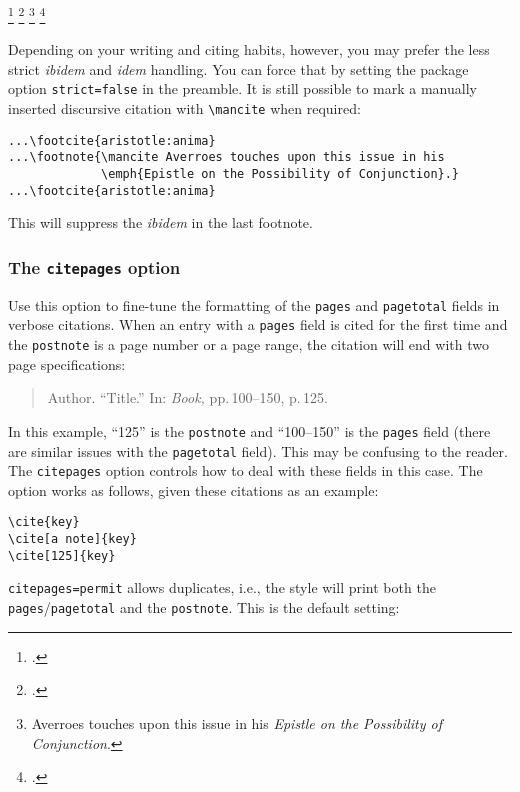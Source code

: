 \documentclass[a4paper]{article}
\newcommand*{\cmd}[1]{\texttt{\textbackslash #1}}
\newenvironment*{pseudofootnotes*}
  {\pseudofootnotes
   \def\footnote##1{\item##1\mancite}}
  {\endpseudofootnotes}
\begin{document}
\begin{pseudofootnotes*}
\footcite{aristotle:anima}
\footcite{aristotle:anima}
\footnote{Averroes touches upon this issue in his \emph{Epistle on
the Possibility of Conjunction}.}
\footcite{aristotle:anima}
\end{pseudofootnotes*}
%
Depending on your writing and citing habits, however, you may prefer
the less strict \emph{ibidem} and \emph{idem} handling. You can
force that by setting the package option \texttt{strict=false} in
the preamble. It is still possible to mark a manually inserted
discursive citation with \cmd{mancite} when required:

\begin{verbatim}
...\footcite{aristotle:anima}
...\footnote{\mancite Averroes touches upon this issue in his
             \emph{Epistle on the Possibility of Conjunction}.}
...\footcite{aristotle:anima}
\end{verbatim}
%
This will suppress the \emph{ibidem} in the last footnote.

\subsubsection*{The \texttt{citepages} option}

Use this option to fine-tune the formatting of the \texttt{pages}
and \texttt{pagetotal} fields in verbose citations. When an entry
with a \texttt{pages} field is cited for the first time and the
\texttt{postnote} is a page number or a page range, the citation
will end with two page specifications:

\begin{quote}
Author. \enquote{Title.} In: \emph{Book,} pp.\,100--150, p.\,125.
\end{quote}
%
In this example, \enquote{125} is the \texttt{postnote} and
\enquote{100--150} is the \texttt{pages} field (there are similar
issues with the \texttt{pagetotal} field). This may be confusing to
the reader. The \texttt{citepages} option controls how to deal with
these fields in this case. The option works as follows, given these
citations as an example:

\begin{verbatim}
\cite{key}
\cite[a note]{key}
\cite[125]{key}
\end{verbatim}
%
\texttt{citepages=permit} allows duplicates, i.e., the style will
print both the \texttt{pages}\slash \texttt{pagetotal} and the
\texttt{postnote}. This is the default setting:
\end{document}
